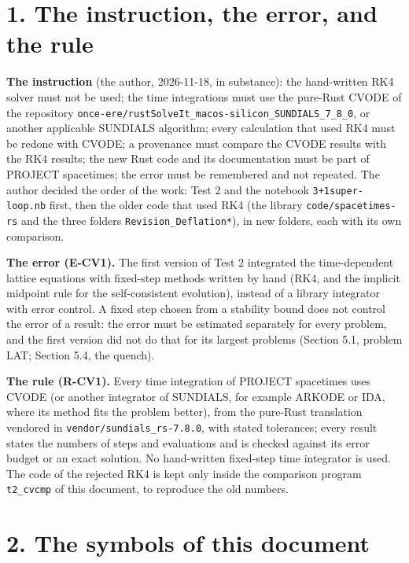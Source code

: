 \documentclass[
  10pt,
]{article}
\begin{document}
\hypertarget{the-instruction-the-error-and-the-rule}{%
\section{1. The instruction, the error, and the
rule}\label{the-instruction-the-error-and-the-rule}}

\textbf{The instruction} (the author, 2026-11-18, in substance): the
hand-written RK4 solver must not be used; the time integrations must use
the pure-Rust CVODE of the repository
\texttt{once-ere/rustSolveIt\_macos-silicon\_SUNDIALS\_7\_8\_0}, or
another applicable SUNDIALS algorithm; every calculation that used RK4
must be redone with CVODE; a provenance must compare the CVODE results
with the RK4 results; the new Rust code and its documentation must be
part of PROJECT spacetimes; the error must be remembered and not
repeated. The author decided the order of the work: Test 2 and the
notebook \texttt{3+1super-loop.nb} first, then the older code that used
RK4 (the library \texttt{code/spacetimes-rs} and the three folders
\texttt{Revision\_Deflation*}), in new folders, each with its own
comparison.

\textbf{The error (E-CV1).} The first version of Test 2 integrated the
time-dependent lattice equations with fixed-step methods written by hand
(RK4, and the implicit midpoint rule for the self-consistent evolution),
instead of a library integrator with error control. A fixed step chosen
from a stability bound does not control the error of a result: the error
must be estimated separately for every problem, and the first version
did not do that for its largest problems (Section 5.1, problem LAT;
Section 5.4, the quench).

\textbf{The rule (R-CV1).} Every time integration of PROJECT spacetimes
uses CVODE (or another integrator of SUNDIALS, for example ARKODE or
IDA, where its method fits the problem better), from the pure-Rust
translation vendored in \texttt{vendor/sundials\_rs-7.8.0}, with stated
tolerances; every result states the numbers of steps and evaluations and
is checked against its error budget or an exact solution. No
hand-written fixed-step time integrator is used. The code of the
rejected RK4 is kept only inside the comparison program
\texttt{t2\_cvcmp} of this document, to reproduce the old numbers.

\hypertarget{the-symbols-of-this-document}{%
\section{2. The symbols of this
document}\label{the-symbols-of-this-document}}
\end{document}
